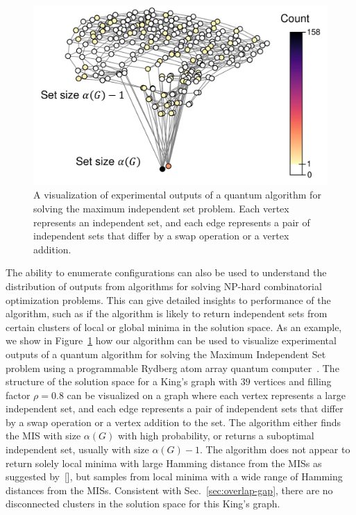 \documentclass[onefignum, onetabnum]{siamart190516}
\newcommand{\<}{\langle}
\renewcommand{\>}{\rangle}
\newcommand{\blue}[1]{[{\bf  \color{blue}{JG: #1}}]}
\newcounter{example}
\begin{document}
\begin{figure} 
    \centering
    \includegraphics[width=.65\textwidth, trim={0cm 0cm 0cm 0cm}, clip]{figures/exp_configurations.pdf}
    \caption{A visualization of experimental outputs of a quantum algorithm for solving the maximum independent set problem.
    Each vertex represents an independent set, and each edge represents a pair of  independent sets that differ by a swap operation or a vertex addition.}
    \label{fig:exp_configuratoins}
\end{figure}
The ability to enumerate configurations can also be used to understand the distribution of outputs from algorithms for solving NP-hard combinatorial optimization problems.
This can give detailed insights to performance of the algorithm, such as if the algorithm is likely to return independent sets from certain clusters of local or global minima in the solution space.
As an example, we show in Figure~\ref{fig:exp_configuratoins} how our algorithm can be used to visualize experimental outputs of a quantum algorithm for solving the Maximum Independent Set problem using a programmable Rydberg atom array quantum computer~\cite{Ebadi2022}.
The structure of the solution space for a King's graph with $39$ vertices and filling factor $\rho=0.8$ can be visualized on a graph where each vertex represents a large independent set, and each edge represents a pair of  independent sets that differ by a swap operation or a vertex addition to the set.
The algorithm either finds the MIS with size $\alpha(G)$ with high probability, or returns a suboptimal independent set, usually with size $\alpha(G)-1.$
The algorithm does not appear to return solely local minima with large Hamming distance from the MISs as suggested by~\cite{altshuler2010}\blue{Fix ref.},
but samples from local minima with a wide range of Hamming distances from the MISs.
Consistent with Sec.~\ref{sec:overlap-gap}, there are no disconnected clusters in the solution space for this King's graph.
\end{document}
